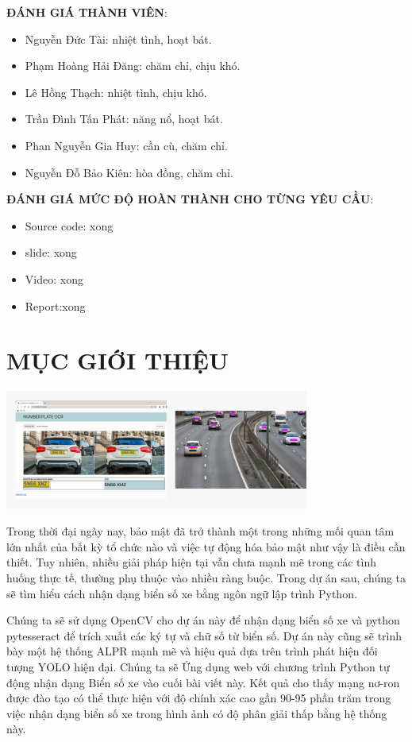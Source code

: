 \documentclass{article}
\begin{document}
\textbf{ĐÁNH GIÁ THÀNH VIÊN}:
\begin{itemize}
    \item Nguyễn Đức Tài: nhiệt tình, hoạt bát. 
    \item Phạm Hoàng Hải Đăng: chăm chỉ, chịu khó.
    \item Lê Hồng Thạch: nhiệt tình, chịu khó.
    \item Trần Đình Tấn Phát: năng nổ, hoạt bát.
    \item Phan Nguyễn Gia Huy: cần cù, chăm chỉ.
    \item Nguyễn Đỗ Bảo Kiên: hòa đồng, chăm chỉ.
\end{itemize}


\textbf{ĐÁNH GIÁ MỨC ĐỘ HOÀN THÀNH CHO TỪNG YÊU CẦU}:

\begin{itemize}
    \item Source code: xong 
    \item slide: xong
    \item Video: xong 
    \item Report:xong
\end{itemize}

\setlength{\parindent}{1cm}
\section{MỤC GIỚI THIỆU}
\includegraphics[width= 10cm]{img/img1/Screenshot 2024-11-20 165252.png}

Trong thời đại ngày nay, bảo mật đã trở thành một trong những mối quan tâm lớn nhất của bất kỳ tổ chức nào và việc tự động hóa bảo mật như vậy là điều cần thiết. Tuy nhiên, nhiều giải pháp hiện tại vẫn chưa mạnh mẽ trong các tình huống thực tế, thường phụ thuộc vào nhiều ràng buộc. Trong dự án sau, chúng ta sẽ tìm hiểu cách nhận dạng biển số xe bằng ngôn ngữ lập trình Python.

Chúng ta sẽ sử dụng OpenCV cho dự án này để nhận dạng biển số xe và python pytesseract để trích xuất các ký tự và chữ số từ biển số. Dự án này cũng sẽ trình bày một hệ thống ALPR mạnh mẽ và hiệu quả dựa trên trình phát
hiện đối tượng YOLO hiện đại. Chúng ta sẽ Ứng dụng web với chương trình Python tự động nhận dạng Biển số xe vào cuối bài viết này. Kết quả cho thấy mạng nơ-ron được đào tạo có thể thực hiện với độ chính xác cao gần 90-95 phần trăm trong việc nhận dạng biển số xe trong hình ảnh có độ phân giải thấp bằng hệ thống này.
\end{document}
